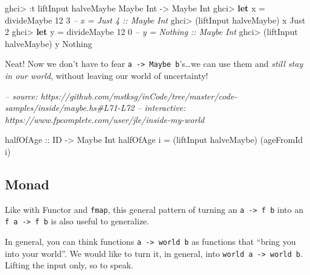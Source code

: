 \documentclass[]{article}
\newenvironment{Shaded}{}{}
\newcommand{\CommentTok}[1]{\textcolor[rgb]{0.38,0.63,0.69}{\textit{#1}}}
\newcommand{\DataTypeTok}[1]{\textcolor[rgb]{0.56,0.13,0.00}{#1}}
\newcommand{\DecValTok}[1]{\textcolor[rgb]{0.25,0.63,0.44}{#1}}
\newcommand{\FunctionTok}[1]{\textcolor[rgb]{0.02,0.16,0.49}{#1}}
\newcommand{\KeywordTok}[1]{\textcolor[rgb]{0.00,0.44,0.13}{\textbf{#1}}}
\newcommand{\NormalTok}[1]{#1}
\newcommand{\OtherTok}[1]{\textcolor[rgb]{0.00,0.44,0.13}{#1}}
\begin{document}
\begin{Shaded}
\begin{Highlighting}[]
\NormalTok{ghci}\FunctionTok{>} \FunctionTok{:}\NormalTok{t liftInput halveMaybe}
\DataTypeTok{Maybe} \DataTypeTok{Int} \OtherTok{->} \DataTypeTok{Maybe} \DataTypeTok{Int}
\NormalTok{ghci}\FunctionTok{>} \KeywordTok{let}\NormalTok{ x }\FunctionTok{=}\NormalTok{ divideMaybe }\DecValTok{12} \DecValTok{3}     \CommentTok{-- x = Just 4 :: Maybe Int}
\NormalTok{ghci}\FunctionTok{>}\NormalTok{ (liftInput halveMaybe) x}
\DataTypeTok{Just} \DecValTok{2}
\NormalTok{ghci}\FunctionTok{>} \KeywordTok{let}\NormalTok{ y }\FunctionTok{=}\NormalTok{ divideMaybe }\DecValTok{12} \DecValTok{0}     \CommentTok{-- y = Nothing :: Maybe Int}
\NormalTok{ghci}\FunctionTok{>}\NormalTok{ (liftInput halveMaybe) y}
\DataTypeTok{Nothing}
\end{Highlighting}
\end{Shaded}

Neat! Now we don't have to fear
\texttt{a\ -\textgreater{}\ Maybe\ b}'s\ldots{}we can use them and \emph{still
stay in our world}, without leaving our world of uncertainty!

\begin{Shaded}
\begin{Highlighting}[]
\CommentTok{-- source: https://github.com/mstksg/inCode/tree/master/code-samples/inside/maybe.hs#L71-L72}
\CommentTok{-- interactive: https://www.fpcomplete.com/user/jle/inside-my-world}

\OtherTok{halfOfAge ::} \DataTypeTok{ID} \OtherTok{->} \DataTypeTok{Maybe} \DataTypeTok{Int}
\NormalTok{halfOfAge i }\FunctionTok{=}\NormalTok{ (liftInput halveMaybe) (ageFromId i)}
\end{Highlighting}
\end{Shaded}

\hypertarget{monad}{%
\subsection{Monad}\label{monad}}

Like with Functor and \texttt{fmap}, this general pattern of turning an
\texttt{a\ -\textgreater{}\ f\ b} into an \texttt{f\ a\ -\textgreater{}\ f\ b}
is also useful to generalize.

In general, you can think functions \texttt{a\ -\textgreater{}\ world\ b} as
functions that ``bring you into your world''. We would like to turn it, in
general, into \texttt{world\ a\ -\textgreater{}\ world\ b}. Lifting the input
only, so to speak.
\end{document}
